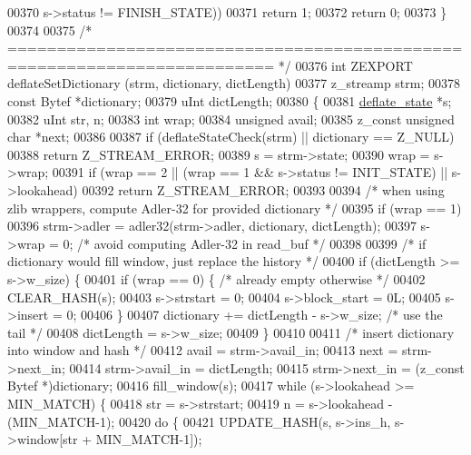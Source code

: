 \begin{DoxyCode}
00370                                            s->status != FINISH\_STATE))
00371         \textcolor{keywordflow}{return} 1;
00372     \textcolor{keywordflow}{return} 0;
00373 \}
00374 
00375 \textcolor{comment}{/* ========================================================================= */}
00376 \textcolor{keywordtype}{int} ZEXPORT deflateSetDictionary (strm, dictionary, dictLength)
00377     z\_streamp strm;
00378     \textcolor{keyword}{const} Bytef *dictionary;
00379     uInt  dictLength;
00380 \{
00381     \hyperlink{structinternal__state}{deflate\_state} *s;
00382     uInt str, n;
00383     \textcolor{keywordtype}{int} wrap;
00384     \textcolor{keywordtype}{unsigned} avail;
00385     z\_const \textcolor{keywordtype}{unsigned} \textcolor{keywordtype}{char} *next;
00386 
00387     \textcolor{keywordflow}{if} (deflateStateCheck(strm) || dictionary == Z\_NULL)
00388         \textcolor{keywordflow}{return} Z\_STREAM\_ERROR;
00389     s = strm->state;
00390     wrap = s->wrap;
00391     \textcolor{keywordflow}{if} (wrap == 2 || (wrap == 1 && s->status != INIT\_STATE) || s->lookahead)
00392         \textcolor{keywordflow}{return} Z\_STREAM\_ERROR;
00393 
00394     \textcolor{comment}{/* when using zlib wrappers, compute Adler-32 for provided dictionary */}
00395     \textcolor{keywordflow}{if} (wrap == 1)
00396         strm->adler = adler32(strm->adler, dictionary, dictLength);
00397     s->wrap = 0;                    \textcolor{comment}{/* avoid computing Adler-32 in read\_buf */}
00398 
00399     \textcolor{comment}{/* if dictionary would fill window, just replace the history */}
00400     \textcolor{keywordflow}{if} (dictLength >= s->w\_size) \{
00401         \textcolor{keywordflow}{if} (wrap == 0) \{            \textcolor{comment}{/* already empty otherwise */}
00402             CLEAR\_HASH(s);
00403             s->strstart = 0;
00404             s->block\_start = 0L;
00405             s->insert = 0;
00406         \}
00407         dictionary += dictLength - s->w\_size;  \textcolor{comment}{/* use the tail */}
00408         dictLength = s->w\_size;
00409     \}
00410 
00411     \textcolor{comment}{/* insert dictionary into window and hash */}
00412     avail = strm->avail\_in;
00413     next = strm->next\_in;
00414     strm->avail\_in = dictLength;
00415     strm->next\_in = (z\_const Bytef *)dictionary;
00416     fill\_window(s);
00417     \textcolor{keywordflow}{while} (s->lookahead >= MIN\_MATCH) \{
00418         str = s->strstart;
00419         n = s->lookahead - (MIN\_MATCH-1);
00420         \textcolor{keywordflow}{do} \{
00421             UPDATE\_HASH(s, s->ins\_h, s->window[str + MIN\_MATCH-1]);

\end{DoxyCode}
